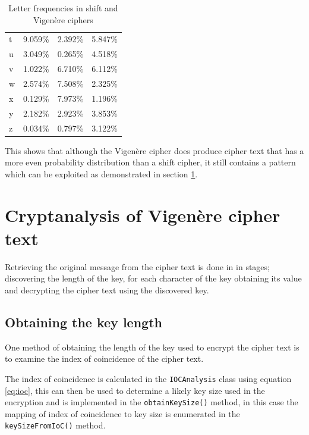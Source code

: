 \documentclass[a4paper]{article}
\newcommand{\Vigenere}{Vigen\`{e}re }
\begin{document}
\begin{table}[h]
\begin{tabular}{@{}lrrr@{}}
    t      & 9.059\%            & 2.392\%      & 5.847\%          \\
    u      & 3.049\%            & 0.265\%      & 4.518\%          \\
    v      & 1.022\%            & 6.710\%      & 6.112\%          \\
    w      & 2.574\%            & 7.508\%      & 2.325\%          \\
    x      & 0.129\%            & 7.973\%      & 1.196\%          \\
    y      & 2.182\%            & 2.923\%      & 3.853\%          \\
    z      & 0.034\%            & 0.797\%      & 3.122\%          \\
    \bottomrule
  \end{tabular}
  \caption{Letter frequencies in shift and \Vigenere ciphers}
  \label{table:letter_frequency_comparison}
\end{table}

This shows that although the \Vigenere cipher does produce cipher text that has
a more even probability distribution than a shift cipher, it still contains a
pattern which can be exploited as demonstrated in section
\ref{sec:cryptanalysis}.

\section{Cryptanalysis of \Vigenere cipher text}
\label{sec:cryptanalysis}

Retrieving the original message from the cipher text is done in in stages;
discovering the length of the key, for each character of the key obtaining its
value and decrypting the cipher text using the discovered key.

\subsection{Obtaining the key length}

One method of obtaining the length of the key used to encrypt the cipher text
is to examine the index of coincidence of the cipher text.

The index of coincidence is calculated in the \texttt{IOCAnalysis} class using
equation \ref{eq:ioc}, this can then be used to determine a likely key size used
in the encryption and is implemented in the \texttt{obtainKeySize()} method, in
this case the mapping of index of coincidence to key size is enumerated in the
\texttt{keySizeFromIoC()} method.
\end{document}
